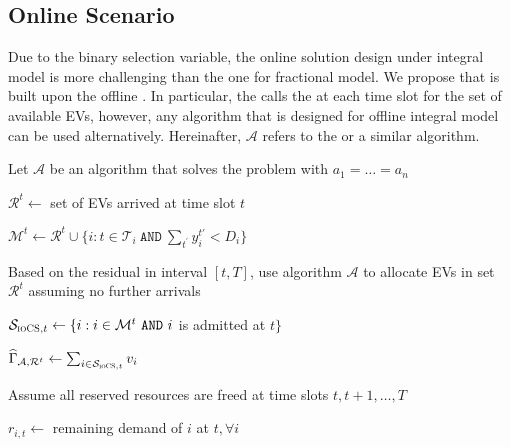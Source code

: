	
\subsection{Online Scenario}
\label{sec:onlineint}
Due to the binary selection variable, the online solution design under integral model is more challenging than the one for fractional model. We propose \iocs that is built upon the offline \ics. In particular, the \iocs calls the \ics at each time slot for the set of available EVs, however, any algorithm that is designed for offline integral model can be used alternatively. Hereinafter, $\mathcal{A}$ refers to the \ics or a similar algorithm.

\begin{algorithm}%
\footnotesize
\caption{\iocs: $\forall t\in \{1,2,\dots ,T\}$}
\label{alg:iocs}
\DontPrintSemicolon 


\BlankLine

Let $\mathcal{A}$ be an algorithm that solves the problem with $a_1=\dots =a_n$

$\mathcal{R}^t\leftarrow$ set of EVs arrived at time slot $t$

$\mathcal{M}^t\leftarrow \mathcal{R}^t\cup \{i: t\in\mathcal{T}_i\ \texttt{AND}\ \sum_{t^\prime}y_{i}^{t'}<D_i\}$ 


Based on the residual in interval $[t,T]$, use algorithm $\mathcal{A}$ to allocate EVs in set $\mathcal{R}^t$ assuming no further arrivals 

$\mathcal{S}_{\iocs,t}\leftarrow\{i:i\in\mathcal{M}^t\ \texttt{AND}\ i$ is admitted at $t\}$

$\widehat{\Gamma}_{\mathcal{A},\mathcal{R}^t}\leftarrow \sum_{i\in\mathcal{S}_{\textsc{ioCS},t}}v_i$

Assume all reserved resources are freed at time slots $t, t+1, \dots, T$



$r_{i,t}\leftarrow$ remaining demand of $i$ at $t, \forall i$



\end{algorithm}
